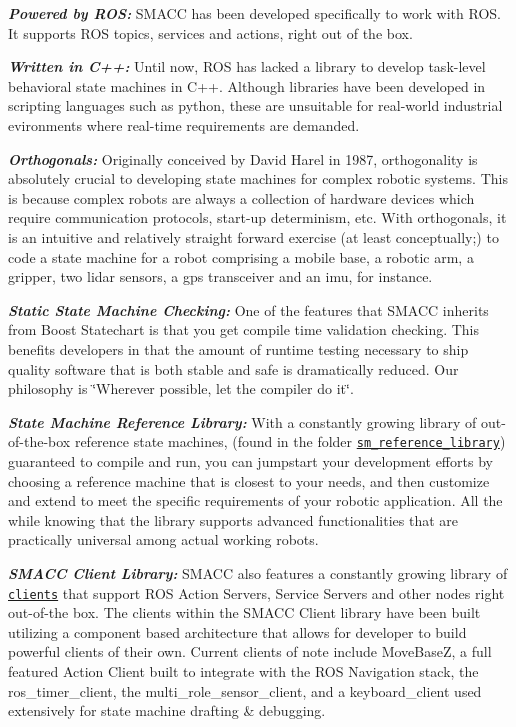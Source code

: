 \begin{DoxyItemize}
\item {\itshape {\bfseries Powered by R\+OS\+:}} S\+M\+A\+CC has been developed specifically to work with R\+OS. It supports R\+OS topics, services and actions, right out of the box.
\item {\itshape {\bfseries Written in C++\+:}} Until now, R\+OS has lacked a library to develop task-\/level behavioral state machines in C++. Although libraries have been developed in scripting languages such as python, these are unsuitable for real-\/world industrial evironments where real-\/time requirements are demanded.
\item {\itshape {\bfseries Orthogonals\+:}} Originally conceived by David Harel in 1987, orthogonality is absolutely crucial to developing state machines for complex robotic systems. This is because complex robots are always a collection of hardware devices which require communication protocols, start-\/up determinism, etc. With orthogonals, it is an intuitive and relatively straight forward exercise (at least conceptually;) to code a state machine for a robot comprising a mobile base, a robotic arm, a gripper, two lidar sensors, a gps transceiver and an imu, for instance.
\item {\itshape {\bfseries Static State Machine Checking\+:}} One of the features that S\+M\+A\+CC inherits from Boost Statechart is that you get compile time validation checking. This benefits developers in that the amount of runtime testing necessary to ship quality software that is both stable and safe is dramatically reduced. Our philosophy is \char`\"{}\+Wherever possible, let the compiler do it\char`\"{}.
\item {\itshape {\bfseries State Machine Reference Library\+:}} With a constantly growing library of out-\/of-\/the-\/box reference state machines, (found in the folder \href{https://github.com/reelrbtx/SMACC/tree/master/smacc_sm_reference_library}{\tt sm\+\_\+reference\+\_\+library}) guaranteed to compile and run, you can jumpstart your development efforts by choosing a reference machine that is closest to your needs, and then customize and extend to meet the specific requirements of your robotic application. All the while knowing that the library supports advanced functionalities that are practically universal among actual working robots.
\item {\itshape {\bfseries S\+M\+A\+CC Client Library\+:}} S\+M\+A\+CC also features a constantly growing library of \href{https://github.com/reelrbtx/SMACC/tree/master/smacc_client_library}{\tt clients} that support R\+OS Action Servers, Service Servers and other nodes right out-\/of-\/the box. The clients within the S\+M\+A\+CC Client library have been built utilizing a component based architecture that allows for developer to build powerful clients of their own. Current clients of note include Move\+BaseZ, a full featured Action Client built to integrate with the R\+OS Navigation stack, the ros\+\_\+timer\+\_\+client, the multi\+\_\+role\+\_\+sensor\+\_\+client, and a keyboard\+\_\+client used extensively for state machine drafting \& debugging.

\end{DoxyItemize}
